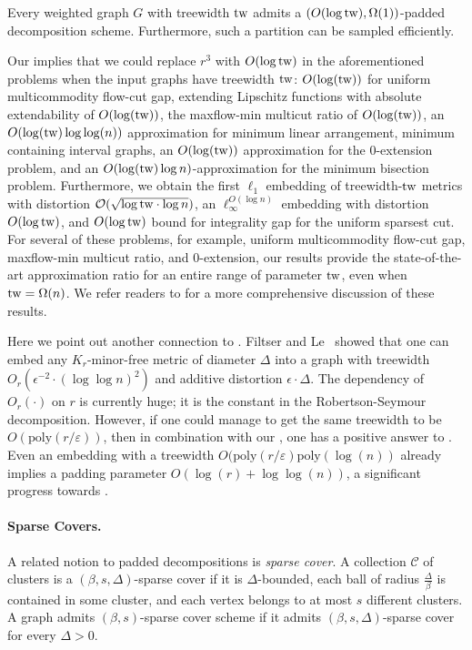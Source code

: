 \documentclass{theoretics}
\newcommand{\tw}{{\rm tw}}
\newcommand{\poly}{\mathrm{poly}}
\def\eps{\varepsilon}
\begin{document}
\begin{theorem}\label{thm:paddedTW}
	Every weighted graph $G$ with treewidth $\tw$ admits a  $\left(O( \log\tw),\Omega(1)\right)$-padded decomposition scheme. Furthermore, such a partition can be sampled efficiently.
\end{theorem}	



Our  implies that we could replace $r^3$ with $O(\log \tw)$ in the aforementioned problems when the input graphs have treewidth $\tw$: $O(\log(\tw))$ for uniform multicommodity flow-cut gap, extending Lipschitz functions with absolute extendability of $O(\log(\tw))$,  the maxflow-min multicut ratio of $O(\log(\tw))$, an $O(\log(\tw) \log\log(n))$ approximation for minimum linear arrangement,  minimum containing interval graphs, an $O(\log(\tw))$ approximation for the 0-extension problem,  and an $O(\log(\tw)\log n)$-approximation for the minimum bisection problem. Furthermore, we obtain  the first $\ell_1$ embedding of treewidth-$\tw$ metrics with distortion $\mathcal{O}(\sqrt{\log \tw \cdot \log n})$, an $\ell^{O(\log n)}_\infty$ embedding with distortion $O(\log \tw)$, and $O(\log \tw)$ bound for integrality gap for the uniform sparsest cut.  For several of these problems, for example, uniform multicommodity flow-cut gap, maxflow-min multicut ratio, and 0-extension, our results provide the state-of-the-art approximation ratio for an entire range of parameter $\tw$, even when $\tw = \Omega(n)$.  We refer readers to  for a more comprehensive discussion of these results. 

Here we point out another connection to . Filtser and Le~\cite{FL22} showed that one can embed any $K_r$-minor-free metric of diameter $\Delta$ into a graph with treewidth $O_r(\epsilon^{-2}\cdot(\log\log n)^2)$ and additive distortion $\epsilon\cdot \Delta$. The dependency of $O_r(\cdot)$ on $r$ is currently huge; it is the constant in the Robertson-Seymour decomposition. However, if one could manage to get the same treewidth to be $O(\poly(r/\eps))$, then in combination with our , one has a positive answer to . Even an embedding with a treewidth $O(\poly(r/\eps)\poly(\log(n))$ already implies a padding parameter $O(\log(r) + \log\log(n))$, a significant progress towards . 

\paragraph*{Sparse Covers.~}
A related notion to padded decompositions is \emph{sparse cover}.
A collection $\mathcal{C}$ of clusters is a $(\beta,s,\Delta)$-sparse cover if it is $\Delta$-bounded, each ball of radius $\frac\Delta\beta$ is contained in some cluster, and each vertex belongs to at most $s$ different clusters. 
A graph admits $(\beta,s)$-sparse cover scheme if it admits $(\beta,s,\Delta)$-sparse cover for every $\Delta>0$.
\end{document}
